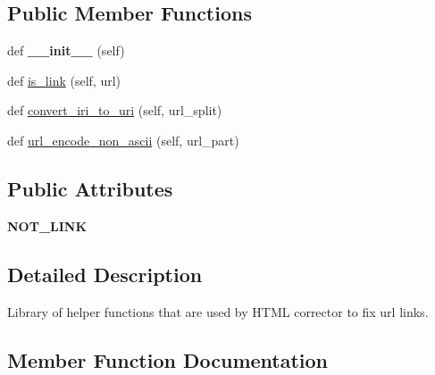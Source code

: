 \subsection*{Public Member Functions}
\begin{DoxyCompactItemize}
\item 
def {\bfseries \+\_\+\+\_\+init\+\_\+\+\_\+} (self)\hypertarget{class_web___crawler_1_1_h_t_m_l__corrector__help_abd44f92aa00e86d2ba9a8867e646e3f7}{}\label{class_web___crawler_1_1_h_t_m_l__corrector__help_abd44f92aa00e86d2ba9a8867e646e3f7}

\item 
def \hyperlink{class_web___crawler_1_1_h_t_m_l__corrector__help_a28cd0ccee8404768e765043ada81176f}{is\+\_\+link} (self, url)
\item 
def \hyperlink{class_web___crawler_1_1_h_t_m_l__corrector__help_a71530aacd9f02ba14c0eb6683698dba9}{convert\+\_\+iri\+\_\+to\+\_\+uri} (self, url\+\_\+split)
\item 
def \hyperlink{class_web___crawler_1_1_h_t_m_l__corrector__help_ad8557b751c09dff4270255c85cfb9b36}{url\+\_\+encode\+\_\+non\+\_\+ascii} (self, url\+\_\+part)
\end{DoxyCompactItemize}
\subsection*{Public Attributes}
\begin{DoxyCompactItemize}
\item 
{\bfseries N\+O\+T\+\_\+\+L\+I\+NK}\hypertarget{class_web___crawler_1_1_h_t_m_l__corrector__help_a18b1945854173c1816b2d1eb0eef7528}{}\label{class_web___crawler_1_1_h_t_m_l__corrector__help_a18b1945854173c1816b2d1eb0eef7528}

\end{DoxyCompactItemize}


\subsection{Detailed Description}
\begin{DoxyVerb}Library of helper functions that are used by HTML corrector to
fix url links.
\end{DoxyVerb}
 

\subsection{Member Function Documentation}
